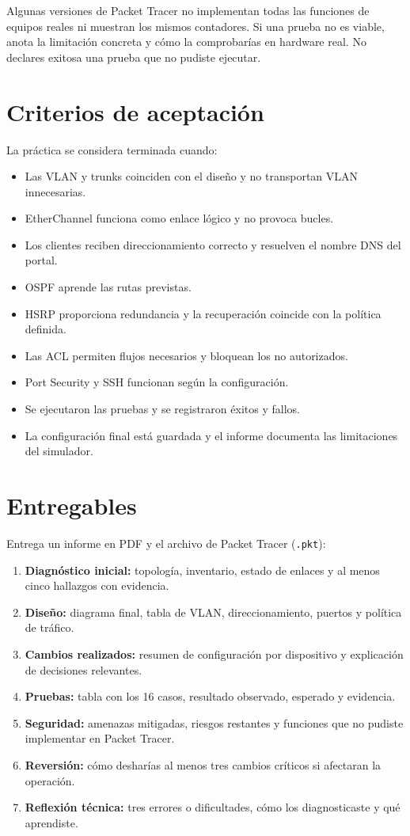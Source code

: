 \documentclass[12pt,a4paper]{article}
\begin{document}
Algunas versiones de Packet Tracer no implementan todas las funciones de equipos reales ni muestran los mismos contadores. Si una prueba no es viable, anota la limitación concreta y cómo la comprobarías en hardware real. No declares exitosa una prueba que no pudiste ejecutar.

\section{Criterios de aceptación}
La práctica se considera terminada cuando:
\begin{itemize}[leftmargin=1.2cm]
 \item Las VLAN y trunks coinciden con el diseño y no transportan VLAN innecesarias.
 \item EtherChannel funciona como enlace lógico y no provoca bucles.
 \item Los clientes reciben direccionamiento correcto y resuelven el nombre DNS del portal.
 \item OSPF aprende las rutas previstas.
 \item HSRP proporciona redundancia y la recuperación coincide con la política definida.
 \item Las ACL permiten flujos necesarios y bloquean los no autorizados.
 \item Port Security y SSH funcionan según la configuración.
 \item Se ejecutaron las pruebas y se registraron éxitos y fallos.
 \item La configuración final está guardada y el informe documenta las limitaciones del simulador.
\end{itemize}

\section{Entregables}
\begin{entrega}
Entrega un informe en PDF y el archivo de Packet Tracer (\texttt{.pkt}):
\begin{enumerate}[leftmargin=1.2cm]
 \item \textbf{Diagnóstico inicial:} topología, inventario, estado de enlaces y al menos cinco hallazgos con evidencia.
 \item \textbf{Diseño:} diagrama final, tabla de VLAN, direccionamiento, puertos y política de tráfico.
 \item \textbf{Cambios realizados:} resumen de configuración por dispositivo y explicación de decisiones relevantes.
 \item \textbf{Pruebas:} tabla con los 16 casos, resultado observado, esperado y evidencia.
 \item \textbf{Seguridad:} amenazas mitigadas, riesgos restantes y funciones que no pudiste implementar en Packet Tracer.
 \item \textbf{Reversión:} cómo desharías al menos tres cambios críticos si afectaran la operación.
 \item \textbf{Reflexión técnica:} tres errores o dificultades, cómo los diagnosticaste y qué aprendiste.
\end{enumerate}
\end{entrega}
\end{document}
